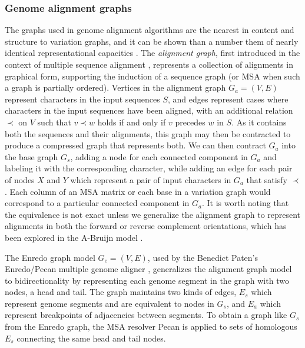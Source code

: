 \subsubsection{Genome alignment graphs}
\label{sec:genome_alignment_graphs}
The graphs used in genome alignment algorithms are the nearest in content and structure to variation graphs, and it can be shown than a number them of nearly identical representational capacities \cite{kehr2014genome}.
The \emph{alignment graph}, first introduced in the context of multiple sequence alignment \cite{kececioglu1993maximum,rausch2008segment}, represents a collection of alignments in graphical form, supporting the induction of a sequence graph (or MSA when such a graph is partially ordered).
Vertices in the alignment graph $G_a = (V, E)$ represent characters in the input sequences $S$, and edges represent cases where characters in the input sequences have been aligned, with an additional relation $\prec$ on $V$ such that $v \prec w$ holds if and only if $v$ precedes $w$ in $S$.
As it contains both the sequences and their alignments, this graph may then be contracted to produce a compressed graph that represents both.
We can then contract $G_a$ into the base graph $G_s$, adding a node for each connected component in $G_a$ and labeling it with the corresponding character, while adding an edge for each pair of nodes $X$ and $Y$ which represent a pair of input characters in $G_a$ that satisfy $\prec$.
Each column of an MSA matrix or each base in a variation graph would correspond to a particular connected component in $G_a$.
It is worth noting that the equivalence is not exact unless we generalize the alignment graph to represent alignments in both the forward or reverse complement orientations, which has been explored in the A-Bruijn model \cite{raphael2004novel}.

The Enredo graph model $G_e = (V, E)$, used by the Benedict Paten's Enredo/Pecan multiple genome aligner \cite{paten2008enredo}, generalizes the alignment graph model to bidirectionality by representing each genome segment in the graph with two nodes, a head and tail.
The graph maintains two kinds of edges, $E_s$ which represent genome segments and are equivalent to nodes in $G_s$, and $E_a$ which represent breakpoints of adjacencies between segments.
To obtain a graph like $G_s$ from the Enredo graph, the MSA resolver Pecan is applied to sets of homologous $E_s$ connecting the same head and tail nodes.

